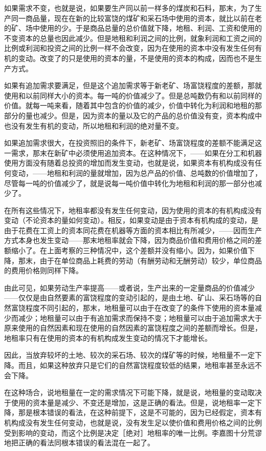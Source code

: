 如果需求不变，也就是说，如果要生产同以前一样多的煤炭和石料，那末，为了生产同一商品量，现在在新的比较富饶的煤矿和采石场中使用的资本，就比以前在老的矿、场中使用的少。于是商品总量的总价值就下降，地租、利润、工资和使用的不变资本的总量也因此减少。但是地租和利润之间的比例，就象利润和工资之间的比例或利润和投资之间的比例一样不会改变，因为在使用的资本中没有发生任何有机的变动。改变了的只是使用的资本的量，不是使用的资本的构成，因而也不是生产方式。

如果有追加需求要满足，但是这个追加需求等于新老矿、场富饶程度的差额，那就使用和以前同样大小的资本。每一吨的价值减少了。但是总吨数仍有和以前同样的价值。就每一吨来看，随着其中包含的价值的减少，价值中转化为利润和地租的那部分的量也减少。但是，因为资本的量以及它的产品的总价值没有变，资本构成中也没有发生有机的变动，所以地租和利润的绝对量不变。

如果追加需求很大，在投资照旧的条件下，新老矿、场富饶程度的差额不能满足这一需求，那末在新矿中必须使用追加资本。在这种情况下，——如果在分工和机器使用方面没有随着总投资的增加而发生变动，也就是说，如果资本有机构成没有任何变动，——地租和利润的量就增加，因为总产品的价值、总吨数的价值增加了，尽管每一吨的价值减少了，就是说每一吨价值中转化为地租和利润的那一部分也减少了。

在所有这些情况下，地租率都没有发生任何变动，因为使用的资本的有机构成没有变动（不论资本的量如何变动）。相反，如果变动是由于资本有机构成的变动，是由于花费在工资上的资本同花费在机器等方面的资本相比有所减少，——因而生产方式本身也发生变动——那末地租率就会下降，因为商品价值和费用价格之间的差额缩小了。在上面考察的三种情况中，这个差额并没有缩小。因为，如果价值下降，那末，由于在单位商品上耗费的劳动（有酬劳动和无酬劳动）较少，单位商品的费用价格则同样下降。

由此可见，如果劳动生产率提高——或者说，生产出来的一定量商品的价值减少——仅仅是由自然要素的富饶程度的变动引起的，是由土地、矿山、采石场等的自然富饶程度不同引起的，那末，地租量可以由于在改变了的条件下使用的资本量减少而减少；地租量可以由于有追加需求而保持不变；地租量可以由于追加需求大于原来使用的自然因素和现在使用的自然因素的富饶程度之间的差额而增长。但是，地租率只有在使用的资本的有机构成发生变动的情况下才能增长。

因此，当放弃较坏的土地、较次的采石场、较次的煤矿等的时候，地租量不一定下降。而且，如果这种放弃只是它们的自然富饶程度较低的结果，地租率甚至永远不会下降。

在这种场合，说地租量在一定的需求情况下可能下降，就是说，地租量的变动取决于使用的资本量是减少、不变还是增加，这是正确的看法。但是，说地租率一定下降，那是根本错误的看法，在这种前提下，这是不可能的，因为已经假定，资本有机构成没有发生任何变动，也就是说，没有发生足以使价值和费用价格之间的比例受到影响的变动，而这个比例是决定［绝对］地租率的唯一比例。李嘉图十分荒谬地把正确的看法同根本错误的看法混在一起了。

